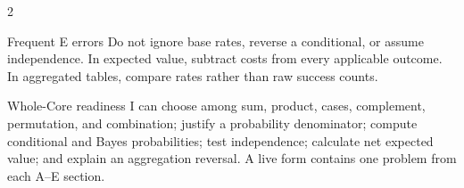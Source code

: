 \documentclass[10pt]{article}
\begin{document}
\begin{multicols}{2}
\begin{warningbox}{Frequent E errors}
Do not ignore base rates, reverse a conditional, or assume independence. In
expected value, subtract costs from every applicable outcome. In aggregated
tables, compare rates rather than raw success counts.
\end{warningbox}

\begin{checklistbox}{Whole-Core readiness}
I can choose among sum, product, cases, complement, permutation, and
combination; justify a probability denominator; compute conditional and Bayes
probabilities; test independence; calculate net expected value; and explain an
aggregation reversal. A live form contains one problem from each A--E section.
\end{checklistbox}
\end{multicols}
\end{document}
